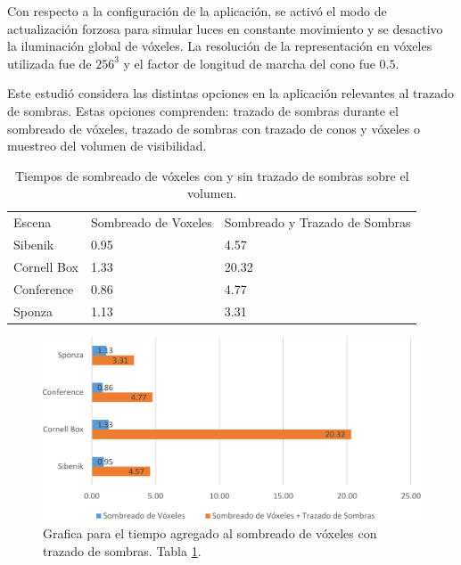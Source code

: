 Con respecto a la configuración de la aplicación, se activó el modo de actualización forzosa para simular luces en constante movimiento y se desactivo la iluminación global de vóxeles. La resolución de la representación en vóxeles utilizada fue de $256^3$ y el factor de longitud de marcha del cono fue $0.5$.

Este estudió considera las distintas opciones en la aplicación relevantes al trazado de sombras. Estas opciones comprenden: trazado de sombras durante el sombreado de vóxeles, trazado de sombras con trazado de conos y vóxeles o muestreo del volumen de visibilidad.

\begin{table}[h]
\centering
\begin{tabular}{lll}
                                  &                                           &                                                                \\ \hline
\multicolumn{1}{|l|}{Escena}      & \multicolumn{1}{l|}{Sombreado de Voxeles} & \multicolumn{1}{l|}{Sombreado y Trazado de Sombras} \\ \hline
\multicolumn{1}{|l|}{Sibenik}     & \multicolumn{1}{l|}{0.95}                 & \multicolumn{1}{l|}{4.57}                                      \\
\multicolumn{1}{|l|}{Cornell Box} & \multicolumn{1}{l|}{1.33}                 & \multicolumn{1}{l|}{20.32}                                     \\
\multicolumn{1}{|l|}{Conference}  & \multicolumn{1}{l|}{0.86}                 & \multicolumn{1}{l|}{4.77}                                      \\
\multicolumn{1}{|l|}{Sponza}      & \multicolumn{1}{l|}{1.13}                 & \multicolumn{1}{l|}{3.31}                                      \\ \hline
\end{tabular}
\caption{Tiempos de sombreado de vóxeles con y sin trazado de sombras sobre el volumen.}
\label{tab:voxelshading_shadowing}
\end{table}

\begin{figure}[h]
	\centering
	\includegraphics[width=0.95\linewidth]{media/voxelshading_shadow_cropped.pdf}
	\caption{Grafica para el tiempo agregado al sombreado de vóxeles con trazado de sombras. Tabla \ref{tab:voxelshading_shadowing}.}
	\label{fig:voxelshading_shadowing}
\end{figure}

